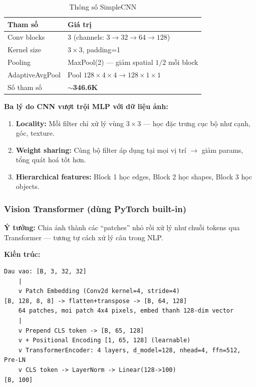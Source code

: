 \documentclass[12pt, a4paper]{article}
\begin{document}
\begin{table}[H]
\centering
\caption{Thông số SimpleCNN}
\begin{tabular}{ll}
\toprule
\textbf{Tham số} & \textbf{Giá trị} \\
\midrule
Conv blocks    & 3 (channels: $3 \rightarrow 32 \rightarrow 64 \rightarrow 128$) \\
Kernel size    & $3\times3$, padding=1 \\
Pooling        & MaxPool(2) --- giảm spatial $1/2$ mỗi block \\
AdaptiveAvgPool & Pool $128\times4\times4 \rightarrow 128\times1\times1$ \\
Số tham số     & $\sim$\textbf{346.6K} \\
\bottomrule
\end{tabular}
\end{table}

\textbf{Ba lý do CNN vượt trội MLP với dữ liệu ảnh:}
\begin{enumerate}
  \item \textbf{Locality:} Mỗi filter chỉ xử lý vùng $3\times3$ --- học đặc trưng cục bộ như cạnh, góc, texture.
  \item \textbf{Weight sharing:} Cùng bộ filter áp dụng tại mọi vị trí $\rightarrow$ giảm params, tổng quát hoá tốt hơn.
  \item \textbf{Hierarchical features:} Block 1 học edges, Block 2 học shapes, Block 3 học objects.
\end{enumerate}

\subsubsection{Vision Transformer (dùng PyTorch built-in)}

\textbf{Ý tưởng:} Chia ảnh thành các ``patches'' nhỏ rồi xử lý như chuỗi tokens qua Transformer --- tương tự cách xử lý câu trong NLP.

\textbf{Kiến trúc:}
\begin{lstlisting}[style=plainstyle]
Dau vao: [B, 3, 32, 32]
    |
    v Patch Embedding (Conv2d kernel=4, stride=4)
[B, 128, 8, 8] -> flatten+transpose -> [B, 64, 128]
    64 patches, moi patch 4x4 pixels, embed thanh 128-dim vector
    |
    v Prepend CLS token -> [B, 65, 128]
    v + Positional Encoding [1, 65, 128] (learnable)
    v TransformerEncoder: 4 layers, d_model=128, nhead=4, ffn=512, Pre-LN
    v CLS token -> LayerNorm -> Linear(128->100)
[B, 100]
\end{lstlisting}
\end{document}
